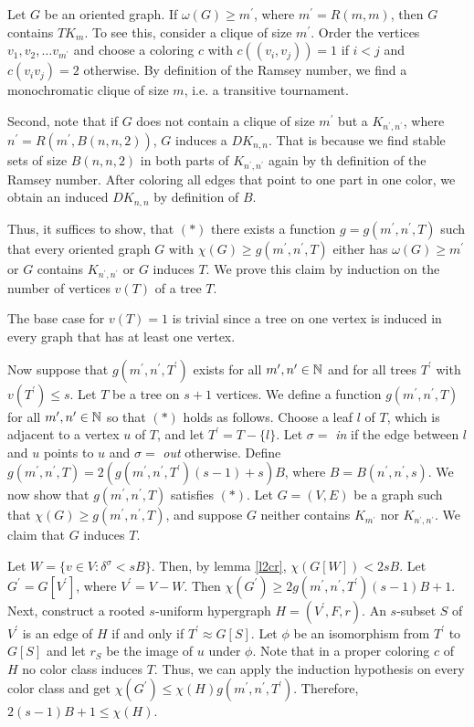 \begin{prf}
Let $G$ be an oriented graph. If $\omega (G)\geq m^\prime$, where $m^\prime = R(m,m)$, then $G$ contains $TK_m$. To see this, consider a clique of size $m^\prime$. Order the vertices $v_1,v_2,\dots v_{m^\prime}$ and choose a coloring $c$ with $c((v_i,v_j))=1$ if $i<j$ and $c(v_iv_j)=2$ otherwise. By definition of the Ramsey number, we find a monochromatic clique of size $m$, i.e. a transitive tournament.

Second, note that if $G$ does not contain a clique of size $m^\prime$ but a $K_{n^\prime , n^\prime}$, where $n^\prime = R(m^\prime , B(n,n,2))$, $G$ induces a $DK_{n,n}$. That is because we find stable sets of size $B(n,n,2)$ in both parts of $K_{n^\prime , n^\prime}$ again by th definition of the Ramsey number. After coloring all edges that point to one part in one color, we obtain an induced $DK_{n,n}$ by definition of $B$. 

Thus, it suffices to show, that $(\ast)$ there exists a function $g=g(m^\prime ,n^\prime ,T)$ such that every oriented graph $G$ with $\chi (G)\geq g(m^\prime ,n^\prime ,T)$ either has $\omega (G)\geq m^\prime$ or $G$ contains $K_{n^\prime ,n^\prime }$ or $G$ induces $T$. We prove this claim by induction on the number of vertices $v(T)$ of a tree $T$. 

The base case for $v(T)=1$ is trivial since a tree on one vertex is induced in every graph that has at least one vertex. 

Now suppose that $g(m^\prime ,n^\prime ,T^\prime )$ exists for all $m^\prime ,n^\prime \in\mathbb{N}$ and for all trees $T^\prime$ with $v(T^\prime )\leq s$. Let $T$ be a tree on $s+1$ vertices. We define a function $g(m^\prime ,n^\prime ,T)$ for all $m^\prime ,n^\prime\in\mathbb{N}$ so that $(\ast)$ holds as follows. Choose a leaf $l$ of $T$, which is adjacent to a vertex $u$ of $T$, and let $T^\prime = T- \{l\}$. Let $\sigma =$ \textit{in} if the edge between $l$ and $u$ points to $u$ and $\sigma = $ \textit{out} otherwise. Define $g(m^\prime ,n^\prime ,T) = 2(g(m^\prime ,n^\prime ,T^\prime )(s-1)+s)B$, where $B=B(n^\prime ,n^\prime ,s)$. We now show that $g(m^\prime ,n^\prime ,T)$ satisfies $(\ast)$. Let $G=(V,E)$ be a graph such that $\chi (G)\geq g(m^\prime ,n^\prime ,T)$, and suppose $G$ neither contains $K_{m^\prime}$ nor $K_{n^\prime ,n^\prime}$. We claim that $G$ induces $T$.

Let $W=\{v\in V:\delta^\sigma <sB\}$. Then, by lemma \ref{l2cr}, $\chi (G[W]) < 2sB$. Let $G^\prime = G[V^\prime ]$, where $V^\prime = V-W$. Then $\chi (G^\prime )\geq 2g(m^\prime ,n^\prime ,T^\prime )(s-1)B + 1$. Next, construct a rooted $s$-uniform hypergraph $H=(V^\prime ,F,r)$. An $s$-subset $S$ of $V^\prime$ is an edge of $H$ if and only if $T^\prime\approx G[S]$. Let $\phi$ be an isomorphism from $T^\prime$ to $G[S]$ and let $r_S$ be the image of $u$ under $\phi$. Note that in a proper coloring $c$ of $H$ no color class induces $T$. Thus, we can apply the induction hypothesis on every color class and get $\chi (G^\prime )\leq \chi (H)g(m^\prime ,n^\prime ,T^\prime )$. Therefore, $2(s-1)B +1\leq \chi (H)$.


\end{prf}
